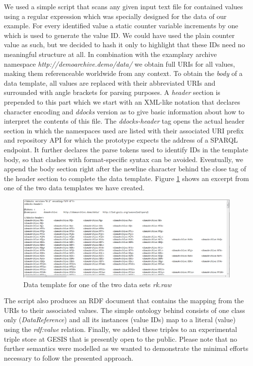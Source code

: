 \documentclass{acm_proc_article-sp}
\begin{document}
We used a simple script that scans any given input text file for contained values using a regular expression which was specially designed for the data of our example.
For every identified value a static counter variable increments by one which is used to generate the value ID.
We could have used the plain counter value as such, but we decided to hash it only to highlight that these IDs need no meaningful structure at all.
In combination with the examplary archive namespace \textit{http://demoarchive.demo/data/} we obtain full URIs for all values, making them referenceable worldwide from any context.
To obtain the \textit{body} of a data template, all values are replaced with their abbreviated URIs and surrounded with angle brackets for parsing purposes.
A \textit{header} section is prepended to this part which we start with an XML-like notation that declares character encoding and \textit{ddocks} version as to give basic information about how to interpret the contents of this file.
The \textit{ddocks-header} tag opens the actual header section in which the namespaces used are listed with their associated URI prefix and repository API for which the prototype expects the address of a SPARQL endpoint.
It further declares the parse tokens used to identify IDs in the template body, so that clashes with format-specific syntax can be avoided.
Eventually, we append the body section right after the newline character behind the close tag of the header section to complete the data template.
Figure \ref{fig:datatemplate} shows an excerpt from one of the two data templates we have created.



\begin{figure}[htb]
\centering
\includegraphics[width=.95\textwidth]{img/datatemplate.png}
\caption{
Data template for one of the two data sets \textit{rk.raw}
}
\label{fig:datatemplate}
\end{figure}


The script also produces an RDF document that contains the mapping from the URIs to their associated values.
The simple ontology behind consists of one class only (\textit{DataReference}) and all its instances (value IDs) map to a literal (value) using the \textit{rdf:value} relation.
Finally, we added these triples to an experimental triple store at GESIS that is presently open to the public.
Please note that no further semantics were modelled as we wanted to demonstrate the minimal efforts necessary to follow the presented approach.
\end{document}
